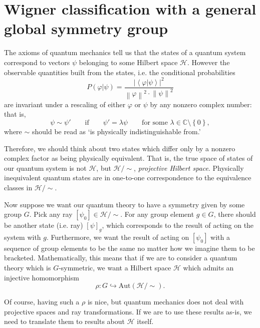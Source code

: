 \documentclass[a4paper,10pt]{scrreprt}
\newcommand{\C}{\mathbb{C}}
\newcommand{\norm}[1]{\left\lVert#1\right\rVert}
\theoremstyle{definition}
\theoremstyle{plain}
\theoremstyle{remark}
\begin{document}
\section{Wigner classification with a general global symmetry group}

The axioms of quantum mechanics tell us that the states of a quantum system correspond to vectors $\psi$ belonging to some Hilbert space $\mathscr{H}$. However the observable quantities built from the states, i.e. the conditional probabilities
\begin{equation*}
  P(\varphi | \psi) = \frac{\left|\left\langle \varphi | \psi \right\rangle\right|^{2}}{\norm{\varphi}^{2} \cdot \norm{\psi}^{2}}
\end{equation*}
are invariant under a rescaling of either $\varphi$ or $\psi$ by any nonzero complex number: that is,
\begin{equation*}
  \psi \sim \psi' \qquad\text{if}\qquad \psi' = \lambda \psi\qquad\text{for some }\lambda \in \C\setminus\left\{ 0 \right\},
\end{equation*}
where $\sim$ should be read as `is physically indistinguishable from.'

Therefore, we should think about two states which differ only by a nonzero complex factor as being physically equivalent. That is, the true space of states of our quantum system is not $\mathscr{H}$, but $\mathscr{H} / \sim$, \emph{projective Hilbert space}. Physically inequivalent quantum states are in one-to-one correspondence to the equivalence classes in $\mathscr{H}/\sim$.

Now suppose we want our quantum theory to have a symmetry given by some group $G$. Pick any ray $[\psi_{0}] \in \mathscr{H}/\sim$. For any group element $g \in G$, there should be another state (i.e. ray) $[\psi]_{g}$, which corresponds to the result of acting on the system with $g$. Furthermore, we want the result of acting on $[\psi_{0}]$ with a sequence of group elements to be the same no matter how we imagine them to be bracketed. Mathematically, this means that if we are to consider a quantum theory which is $G$-symmetric, we want a Hilbert space $\mathscr{H}$ which admits an injective homomorphism
\begin{equation*}
  \rho\colon G \hookrightarrow \mathrm{Aut}(\mathscr{H}/\sim).
\end{equation*}

Of course, having such a $\rho$ is nice, but quantum mechanics does not deal with projective spaces and ray transformations. If we are to use these results as-is, we need to translate them to results about $\mathscr{H}$ itself.
\end{document}
